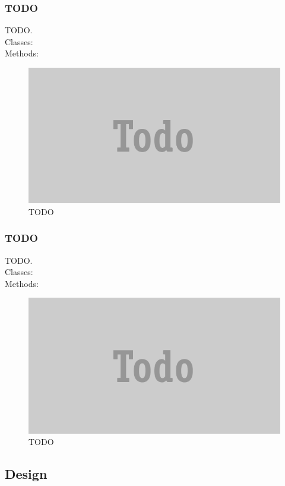 \documentclass[JCDReport.tex]{subfiles}
\begin{document}
\subsubsection{TODO}
TODO.\\
Classes:\\
Methods:\\
\begin{figure}[h!]
	\centering
	\includegraphics[scale=1]{Images/todo.png} 
	\caption{TODO}
\end{figure}




% 
\subsubsection{TODO}
TODO.\\
Classes:\\
Methods:\\
\begin{figure}[h!]
	\centering
	\includegraphics[scale=1]{Images/todo.png} 
	\caption{TODO}
\end{figure}




\subsection{Design}
\end{document}
